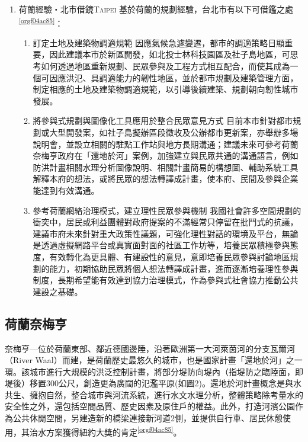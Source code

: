 \documentclass[a4paper,12pt]{article}
\begin{document}
\begin{enumerate}
\item 荷蘭經驗・北市借鏡\hfill{}\textsc{Taipei}
\label{sec:org6852ac8}
基於荷蘭的規劃經驗，台北市有以下可借鑑之處\textsuperscript{\ref{orgf04ac85}}：\\
\begin{enumerate}
\item 訂定土地及建築物調適規範   因應氣候急遽變遷，都市的調適策略日顯重要，因此建議本市於新區開發，如北投士林科技園區及社子島地區，可思考如何透過地區重新規劃、民眾參與及工程方式相互配合，而使其成為一個可因應洪氾、具調適能力的韌性地區，並於都市規劃及建築管理方面，制定相應的土地及建築物調適規範，以引導後續建築、規劃朝向韌性城市發展。\\
\item 將參與式規劃與圖像化工具應用於整合民眾意見方式   目前本市針對都市規劃或大型開發案，如社子島擬辦區段徵收及公辦都市更新案，亦舉辦多場說明會，並設立相關的駐點工作站與地方長期溝通；建議未來可參考荷蘭奈梅亨政府在「還地於河」案例，加強建立與民眾共通的溝通語言，例如防洪計畫相關水理分析圖像說明、相關計畫簡易的構想圖、輔助系統工具解釋本府的想法，或將民眾的想法轉譯成計畫，使本府、民間及參與企業能達到有效溝通。\\
\item 參考荷蘭網絡治理模式，建立理性民眾參與機制   我國社會許多空間規劃的衝突中，居民或利益團體對政府提案的不滿經常只停留在批鬥式的抗議，建議市府未來針對重大政策性議題，可強化理性對話的環境及平台，無論是透過虛擬網路平台或真實面對面的社區工作坊等，培養民眾積極參與態度，有效轉化為更具體、有建設性的意見，意即培養民眾參與討論地區規劃的能力，初期協助民眾將個人想法轉譯成計畫，進而逐漸培養理性參與制度，長期希望能有效達到協力治理模式，作為參與式社會協力推動公共建設之基礎。\\
\end{enumerate}
\end{enumerate}

\subsection{荷蘭奈梅亨}
\label{sec:org3b8d40b}
奈梅亨—位於荷蘭東部、鄰近德國邊陲，沿著歐洲第一大河萊茵河的分支瓦爾河（River Waal）而建，是荷蘭歷史最悠久的城市，也是國家計畫「還地於河」之一環。該城市進行大規模的洪泛控制計畫，將部分堤防向堤內（指堤防之臨陸面，即堤後）移置300公尺，創造更為廣闊的氾濫平原(如圖2)。還地於河計畫概念是與水共生、擁抱自然，整合城市與河流系統，進行水文水理分析，整體策略除考量水的安全性之外，還包括空間品質、歷史因素及原住戶的權益。此外，打造河濱公園作為公共休閒空間，另建造新的橋梁連接新河道2側，並提供自行車、居民休憩使用，其治水方案獲得紐約大獎的肯定\textsuperscript{\ref{orgf04ac85}}。\\
\end{document}
